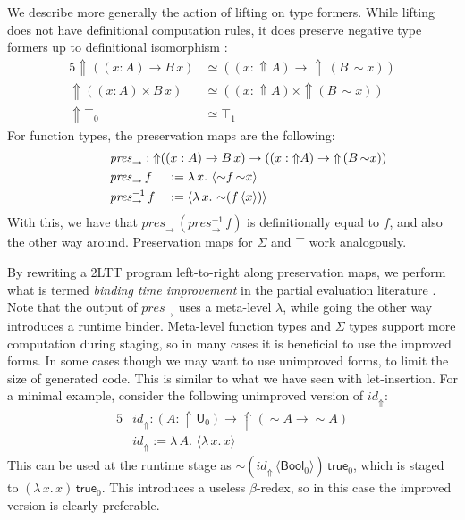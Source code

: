 \documentclass[acmsmall,anonymous,review]{acmart}
\newcommand{\mit}[1]{\mathit{#1}}
\newcommand{\msf}[1]{\mathsf{#1}}
\newcommand{\Lift}{{\Uparrow}}
\newcommand{\spl}{{\sim}}
\newcommand{\qut}[1]{\langle #1\rangle}
\renewcommand{\U}{\msf{U}}
\newcommand{\Bool}{\msf{Bool}}
\newcommand{\true}{\msf{true}}
\theoremstyle{remark}
\begin{document}
We describe more generally the action of lifting on type formers. While lifting
does not have definitional computation rules, it does preserve negative type formers up
to definitional isomorphism \cite[Section~2.3]{twolevel}:
\begin{alignat*}{5}
  \Lift((x : A) \to B\,x) &\simeq ((x : \Lift A) \to \Lift\,(B\,\spl x))\\
  \Lift ((x : A) \times B\,x) &\simeq ((x : \Lift A) \times \Lift (B\,\spl x))\\
  \Lift \top_0 &\simeq \top_1
\end{alignat*}
For function types, the preservation maps are the following:
\begin{alignat*}{5}
  & \hspace{-6em}\rlap{$\mit{pres}_\to : \Lift((x : A) \to B\,x) \to ((x : \Lift A) \to \Lift\,(B\,\spl x))$}\\
  & \hspace{-6em}\mit{pres}_\to\,f     &&:= \lambda\,x.\,\,\qut{\spl f\,\spl x}\\
  & \hspace{-6em}\mit{pres}_\to^{-1}\,f &&:= \qut{\lambda\,x.\,\,\spl(f\,\qut{x})}
\end{alignat*}
With this, we have that $\mit{pres}_\to\,(\mit{pres}_\to^{-1}\,f)$ is
definitionally equal to $f$, and also the other way around. Preservation maps
for $\Sigma$ and $\top$ work analogously.

By rewriting a 2LTT program left-to-right along preservation maps, we perform
what is termed \emph{binding time improvement} in the partial evaluation
literature \cite[Chapter~12]{partial-evaluation}. Note that the output of $\mit{pres}_{\to}$ uses a
meta-level $\lambda$, while going the other way introduces a runtime
binder. Meta-level function types and $\Sigma$ types support more computation during
staging, so in many cases it is beneficial to use the improved forms. In some
cases though we may want to use unimproved forms, to limit the size of generated
code. This is similar to what we have seen with let-insertion. For a minimal
example, consider the following unimproved version of $\mit{id}_\Lift$:
\begin{alignat*}{5}
  & \mit{id}_\Lift : (A : \Lift \U_0) \to \Lift(\spl A \to \spl A) \\
  & \mit{id}_\Lift := \lambda\,A.\,\,\qut{\lambda\,x.\,x}
\end{alignat*}
This can be used at the runtime stage as
$\spl(\mit{id}_\Lift\,\qut{\Bool_0})\,\true_0$, which is staged to
$(\lambda\,x.\,x)\,\true_0$.  This introduces a useless $\beta$-redex, so in
this case the improved version is clearly preferable.
\end{document}
